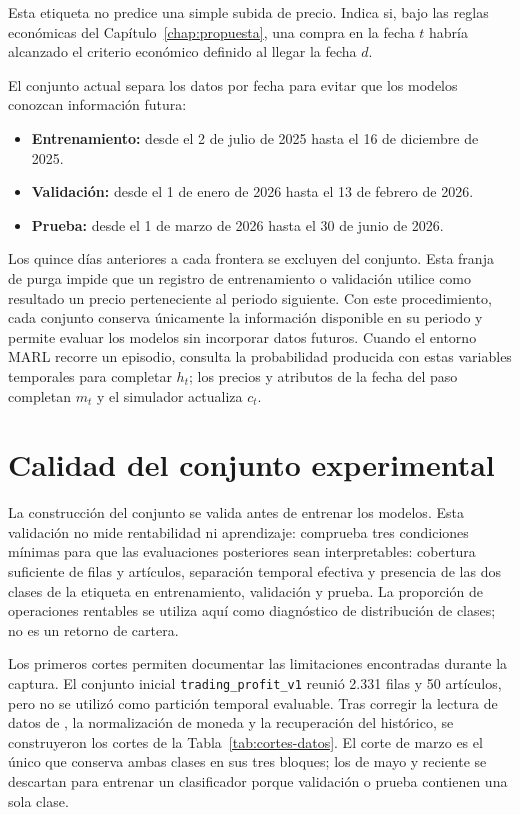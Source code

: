 Esta etiqueta no predice una simple subida de precio. Indica si, bajo las reglas económicas del Capítulo~\ref{chap:propuesta}, una compra en la fecha $t$ habría alcanzado el criterio económico definido al llegar la fecha $d$.

El conjunto actual separa los datos por fecha para evitar que los modelos conozcan información futura:

\begin{itemize}
  \item \textbf{Entrenamiento:} desde el 2 de julio de 2025 hasta el 16 de diciembre de 2025.
  \item \textbf{Validación:} desde el 1 de enero de 2026 hasta el 13 de febrero de 2026.
  \item \textbf{Prueba:} desde el 1 de marzo de 2026 hasta el 30 de junio de 2026.
\end{itemize}

Los quince días anteriores a cada frontera se excluyen del conjunto. Esta franja de purga impide que un registro de entrenamiento o validación utilice como resultado un precio perteneciente al periodo siguiente. Con este procedimiento, cada conjunto conserva únicamente la información disponible en su periodo y permite evaluar los modelos sin incorporar datos futuros. Cuando el entorno MARL recorre un episodio, consulta la probabilidad producida con estas variables temporales para completar $h_t$; los precios y atributos de la fecha del paso completan $m_t$ y el simulador actualiza $c_t$.

\section{Calidad del conjunto experimental}
\label{sec:calidad-conjunto-experimental}

La construcción del conjunto se valida antes de entrenar los modelos. Esta validación no mide rentabilidad ni aprendizaje: comprueba tres condiciones mínimas para que las evaluaciones posteriores sean interpretables: cobertura suficiente de filas y artículos, separación temporal efectiva y presencia de las dos clases de la etiqueta en entrenamiento, validación y prueba. La proporción de operaciones rentables se utiliza aquí como diagnóstico de distribución de clases; no es un retorno de cartera.

Los primeros cortes permiten documentar las limitaciones encontradas durante la captura. El conjunto inicial \texttt{trading\_profit\_v1} reunió 2.331 filas y 50 artículos, pero no se utilizó como partición temporal evaluable. Tras corregir la lectura de datos de , la normalización de moneda y la recuperación del histórico, se construyeron los cortes de la Tabla~\ref{tab:cortes-datos}. El corte de marzo es el único que conserva ambas clases en sus tres bloques; los de mayo y reciente se descartan para entrenar un clasificador porque validación o prueba contienen una sola clase.

